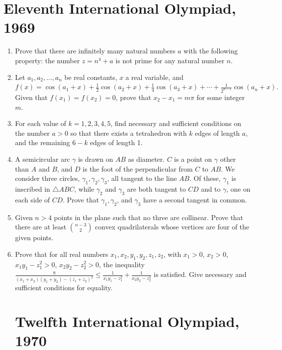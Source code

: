 \documentclass{article}
\begin{document}
\section*{Eleventh International Olympiad, 1969}

\begin{enumerate}

    \item Prove that there are infinitely many natural numbers \( a \) with the following property: the number \( z = n^4 + a \) is not prime for any natural number \( n \).

    \item Let \( a_1, a_2, \dots, a_n \) be real constants, \( x \) a real variable, and
    $
    f(x) = \cos(a_1 + x) + \frac{1}{2} \cos(a_2 + x) + \frac{1}{4} \cos(a_3 + x) + \cdots + \frac{1}{2^{n-1}} \cos(a_n + x).
    $
    Given that \( f(x_1) = f(x_2) = 0 \), prove that \( x_2 - x_1 = m\pi \) for some integer \( m \).

    \item For each value of \( k = 1, 2, 3, 4, 5 \), find necessary and sufficient conditions on the number \( a > 0 \) so that there exists a tetrahedron with \( k \) edges of length \( a \), and the remaining \( 6 - k \) edges of length 1.

    \item A semicircular arc \( \gamma \) is drawn on \( AB \) as diameter. \( C \) is a point on \( \gamma \) other than \( A \) and \( B \), and \( D \) is the foot of the perpendicular from \( C \) to \( AB \). We consider three circles, \( \gamma_1, \gamma_2, \gamma_3 \), all tangent to the line \( AB \). Of these, \( \gamma_1 \) is inscribed in \( \triangle ABC \), while \( \gamma_2 \) and \( \gamma_3 \) are both tangent to \( CD \) and to \( \gamma \), one on each side of \( CD \). Prove that \( \gamma_1, \gamma_2 \), and \( \gamma_3 \) have a second tangent in common.

    \item Given \( n > 4 \) points in the plane such that no three are collinear. Prove that there are at least
    $
    \binom{n - 3}{2}
    $
    convex quadrilaterals whose vertices are four of the given points.

    \item Prove that for all real numbers \( x_1, x_2, y_1, y_2, z_1, z_2 \), with \( x_1 > 0 \), \( x_2 > 0 \), \( x_1y_1 - z_1^2 > 0 \), \( x_2y_2 - z_2^2 > 0 \), the inequality
    $
    \frac{8}{(x_1 + x_2)(y_1 + y_2) - (z_1 + z_2)^2} \leq \frac{1}{x_1y_1 - z_1^2} + \frac{1}{x_2y_2 - z_2^2}
    $
    is satisfied. Give necessary and sufficient conditions for equality.
\section*{Twelfth International Olympiad, 1970}
\end{enumerate}
\end{document}
